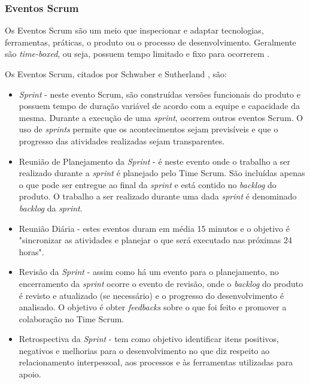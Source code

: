 \subsubsection{Eventos Scrum}
Os Eventos Scrum são um meio que inspecionar e adaptar tecnologias, ferramentas, práticas, o produto ou o processo de desenvolvimento. Geralmente são \textit{time-boxed}, ou seja, possuem tempo limitado e fixo para ocorrerem \cite{schwaber_guia_2013}.

Os Eventos Scrum, citados por Schwaber e Sutherland \cite{schwaber_guia_2013}, são:

\begin{itemize}
\item \textit{Sprint} - neste evento Scrum, são construídas versões funcionais do produto e possuem tempo de duração variável de acordo com a equipe e capacidade da mesma. Durante a execução de uma \textit{sprint}, ocorrem outros eventos Scrum. O uso de \textit{sprints} permite que os acontecimentos sejam previsíveis e que o progresso das atividades realizadas sejam transparentes.

\item Reunião de Planejamento da \textit{Sprint} - é neste evento onde o trabalho a ser realizado durante a \textit{sprint} é planejado pelo Time Scrum. São incluídas apenas o que pode ser entregue ao final da \textit{sprint} e está contido no \textit{backlog} do produto. O trabalho a ser realizado durante uma dada \textit{sprint} é denominado \textit{backlog} da \textit{sprint}.

\item Reunião Diária - estes eventos duram em média 15 minutos e o objetivo é "sincronizar as atividades e planejar o que será executado nas próximas 24 horas".

\item Revisão da \textit{Sprint} - assim como há um evento para o planejamento, no encerramento da \textit{sprint} ocorre o evento de revisão, onde o \textit{backlog} do produto é revisto e atualizado (se necessário) e o progresso do desenvolvimento é analisado. O objetivo é obter \textit{feedbacks} sobre o que foi feito e promover a colaboração no Time Scrum.

\item Retrospectiva da \textit{Sprint} - tem como objetivo identificar itens positivos, negativos e melhorias para o desenvolvimento no que diz respeito ao relacionamento interpessoal, aos processos e às ferramentas utilizadas para apoio.

\end{itemize}

